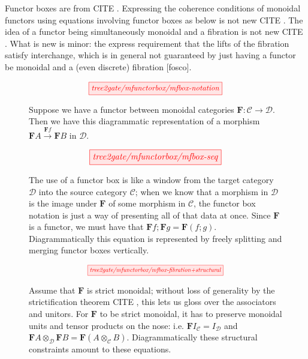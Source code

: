 \begin{scholium}
Functor boxes are from \bR CITE \e. Expressing the coherence conditions of monoidal functors using equations involving functor boxes as below is not new \bR CITE \e.
The idea of a functor being simultaneously monoidal and a fibration is not new \bR CITE \e. What is new is minor: the express requirement that the lifts of the fibration satisfy interchange, which is in general not guaranteed by just having a functor be monoidal and a (even discrete) fibration [fosco].
\end{scholium}

\begin{figure}[h!]
\[\resizebox{0.5\textwidth}{!}{\tikzfig{tree2gate/mfunctorbox/mfbox-notation}}\]
\caption{Suppose we have a functor between monoidal categories $\mathbf{F}: \mathcal{C} \rightarrow \mathcal{D}$. Then we have this diagrammatic representation of a morphism $\mathbf{F}A \overset{\mathbf{F}f}{\rightarrow} \mathbf{F}B$ in $\mathcal{D}$.}
\end{figure}

\begin{figure}[h!]
\[\resizebox{0.5\textwidth}{!}{\tikzfig{tree2gate/mfunctorbox/mfbox-seq}}\]
\caption{The use of a functor box is like a window from the target category $\mathcal{D}$ into the source category $\mathcal{C}$; when we know that a morphism in $\mathcal{D}$ is the image under $\mathbf{F}$ of some morphism in $\mathcal{C}$, the functor box notation is just a way of presenting all of that data at once. Since $\mathbf{F}$ is a functor, we must have that $\mathbf{F}f ; \mathbf{F}g = \mathbf{F}(f;g)$. Diagrammatically this equation is represented by freely splitting and merging functor boxes vertically.}
\end{figure}

\begin{figure}[h!]
\[\resizebox{0.5\textwidth}{!}{\tikzfig{tree2gate/mfunctorbox/mfbox-fibration+structural}}\]
\caption{Assume that $\mathbf{F}$ is strict monoidal; without loss of generality by the strictification theorem \bR CITE \e, this lets us gloss over the associators and unitors. For $\mathbf{F}$ to be strict monoidal, it has to preserve monoidal units and tensor products on the nose: i.e. $\mathbf{F}I_\mathcal{C} = I_\mathcal{D}$ and $\mathbf{F}A \otimes_\mathcal{D} \mathbf{F}B = \mathbf{F}(A \otimes_\mathcal{C} B)$. Diagrammatically these structural constraints amount to these equations.}
\end{figure}

